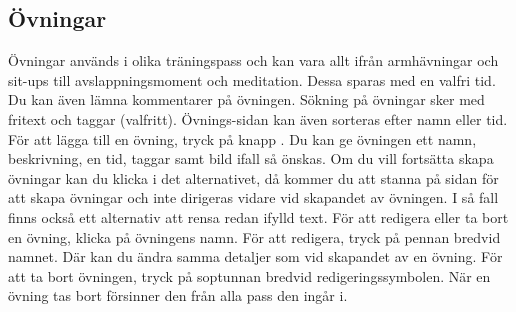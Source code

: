 \documentclass{article}
\newcommand*{\img}[1]{%
    \raisebox{-.3\baselineskip}{%
        \texttt{[image: \#1]}%
    }%
}
\begin{document}
{    \subsection{Övningar}
        Övningar används i olika träningspass och kan vara allt ifrån armhävningar och sit-ups till avslappningsmoment och meditation. Dessa sparas med en valfri tid. Du kan även lämna kommentarer på övningen. Sökning på övningar sker med fritext och taggar (valfritt). Övnings-sidan kan även sorteras efter namn eller tid. För att lägga till en övning, tryck på knapp \img{images/icons ref/RoundButton.png}. Du kan ge övningen ett namn, beskrivning, en tid, taggar samt bild ifall så önskas. Om du vill fortsätta skapa övningar kan du klicka i det alternativet, då kommer du att stanna på sidan för att skapa övningar och inte dirigeras vidare vid skapandet av övningen. I så fall finns också ett alternativ att rensa redan ifylld text. För att redigera eller ta bort en övning, klicka på övningens namn. För att redigera, tryck på pennan \img{images/icons ref/pencil.png} bredvid namnet. Där kan du ändra samma detaljer som vid skapandet av en övning. För att ta bort övningen, tryck på soptunnan \img{images/icons ref/trash.png} bredvid redigeringssymbolen. När en övning tas bort försinner den från alla pass den ingår i.
    \begin{figure}[h!]
    \centering
\end{figure}}
\end{document}
